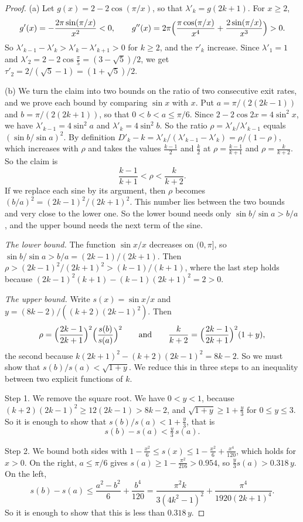 \documentclass[EJP,preprint]{ejpecp}
\begin{document}
\begin{proof}
(a) Let $g(x)=2-2\cos(\pi/x)$, so that $\lambda'_k=g(2k+1)$. For $x\ge2$,
\[
 g'(x)=-\frac{2\pi\sin(\pi/x)}{x^2}<0,\qquad
 g''(x)=2\pi\Bigl(\frac{\pi\cos(\pi/x)}{x^4}+\frac{2\sin(\pi/x)}{x^3}\Bigr)>0 .
\]
So $\lambda'_{k-1}-\lambda'_k>\lambda'_k-\lambda'_{k+1}>0$ for $k\ge2$, and
the $\tau'_k$ increase. Since $\lambda'_1=1$ and
$\lambda'_2=2-2\cos\frac\pi5=(3-\sqrt5)/2$, we get
$\tau'_2=2/(\sqrt5-1)=(1+\sqrt5)/2$.

(b) We turn the claim into two bounds on the ratio of two consecutive exit
rates, and we prove each bound by comparing $\sin x$ with $x$. Put
$a=\pi/(2(2k-1))$ and $b=\pi/(2(2k+1))$, so that $0<b<a\le\pi/6$. Since
$2-2\cos2x=4\sin^2x$, we have $\lambda'_{k-1}=4\sin^2a$ and
$\lambda'_k=4\sin^2b$. So the ratio $\rho=\lambda'_k/\lambda'_{k-1}$ equals
$(\sin b/\sin a)^2$. By definition
$D'_k-k=\lambda'_k/(\lambda'_{k-1}-\lambda'_k)=\rho/(1-\rho)$, which increases
with $\rho$ and takes the values $\frac{k-1}2$ and $\frac k2$ at
$\rho=\frac{k-1}{k+1}$ and $\rho=\frac k{k+2}$. So the claim is
\[
 \frac{k-1}{k+1}<\rho<\frac k{k+2}.
\]
If we replace each sine by its argument, then $\rho$ becomes
$(b/a)^2=(2k-1)^2/(2k+1)^2$. This number lies between the two bounds and very
close to the lower one. So the lower bound needs only $\sin b/\sin a>b/a$, and
the upper bound needs the next term of the sine.

\emph{The lower bound.} The function $\sin x/x$ decreases on $(0,\pi]$, so
$\sin b/\sin a>b/a=(2k-1)/(2k+1)$. Then $\rho>(2k-1)^2/(2k+1)^2>(k-1)/(k+1)$,
where the last step holds because $(2k-1)^2(k+1)-(k-1)(2k+1)^2=2>0$.

\emph{The upper bound.} Write $s(x)=\sin x/x$ and
$y=(8k-2)/((k+2)(2k-1)^2)$. Then
\[
 \rho=\Bigl(\frac{2k-1}{2k+1}\Bigr)^2\Bigl(\frac{s(b)}{s(a)}\Bigr)^2
 \qquad\text{and}\qquad
 \frac k{k+2}=\Bigl(\frac{2k-1}{2k+1}\Bigr)^2(1+y),
\]
the second because $k(2k+1)^2-(k+2)(2k-1)^2=8k-2$. So we must show that
$s(b)/s(a)<\sqrt{1+y}$. We reduce this in three steps to an inequality between
two explicit functions of $k$.

Step 1. We remove the square root. We have $0<y<1$, because
$(k+2)(2k-1)^2\ge12(2k-1)>8k-2$, and $\sqrt{1+y}\ge1+\frac y3$ for
$0\le y\le3$. So it is enough to show that $s(b)/s(a)<1+\frac y3$, that is
\[
 s(b)-s(a)<\tfrac y3\,s(a).
\]

Step 2. We bound both sides with
$1-\frac{x^2}6\le s(x)\le1-\frac{x^2}6+\frac{x^4}{120}$, which holds for
$x>0$. On the right, $a\le\pi/6$ gives $s(a)\ge1-\frac{\pi^2}{216}>0.954$, so
$\frac y3s(a)>0.318\,y$. On the left,
\[
 s(b)-s(a)\le\frac{a^2-b^2}6+\frac{b^4}{120}
 =\frac{\pi^2k}{3(4k^2-1)^2}+\frac{\pi^4}{1920(2k+1)^4}.
\]
So it is enough to show that this is less than $0.318\,y$.


\end{proof}
\end{document}
